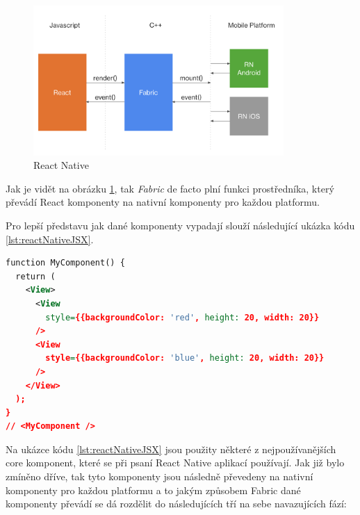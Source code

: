 \begin{figure}[H]
  \centering
  \includegraphics[width=0.85\textwidth]{react-natice-xplat-implementation-diagram.png}
  \caption{React Native }
  \label{fig:react-natice-xplat-implementation-diagram}
\end{figure}





Jak je vidět na obrázku \ref{fig:react-natice-xplat-implementation-diagram}, tak \textit{Fabric} de facto plní funkci prostředníka, který převádí React 
komponenty na nativní komponenty pro každou platformu. 

Pro lepší představu jak dané komponenty vypadají slouží následující ukázka kódu \ref{lst:reactNativeJSX}.

\begin{lstlisting}[caption={Popis UI komponent pomoci JSX}, label={lst:reactNativeJSX}, language=XML]
function MyComponent() {
  return (
    <View>
      <View
        style={{backgroundColor: 'red', height: 20, width: 20}}
      />
      <View
        style={{backgroundColor: 'blue', height: 20, width: 20}}
      />
    </View>
  );
}
// <MyComponent />
\end{lstlisting}

Na ukázce kódu \ref{lst:reactNativeJSX} jsou použity některé z nejpoužívanějších core komponent, které se při psaní React
Native aplikací používají. \cite{reactNativeComponents} Jak již bylo zmíněno dříve, tak tyto komponenty jsou následně převedeny 
na nativní komponenty pro každou platformu a to jakým způsobem Fabric dané komponenty převádí se dá rozdělit do následujících tří
na sebe navazujících fází: \cite{reactNativeRenderCommitMount}
 
